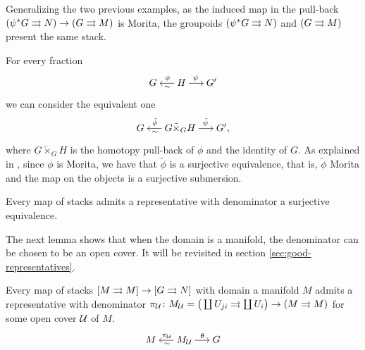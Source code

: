 \begin{example}
Generalizing the two previous examples, as the induced map in the pull-back $(\psi^*G\rightrightarrows N) \to (G\rightrightarrows M)$ is Morita, the groupoids $(\psi^*G\rightrightarrows N)$ and $(G\rightrightarrows M)$ present the same stack.
\end{example}


For every fraction
\begin{equation}
\begin{tikzcd}[sep = small]
  G & H \ar[shorten = -.15em]{l}[pos=.45, sloped, below]{\sim}[pos=.45, sloped, above]{\phi} \ar[shorten = -.15em]{r}[pos=.45]{\psi} & G'
\end{tikzcd}
\end{equation}
we can consider the equivalent one
\begin{equation}
\begin{tikzcd}[sep = small]
 G & G\tilde\times_G H \ar[shorten = -.15em]{l}[pos=.45, sloped, below]{\sim}[pos=.45, sloped, above]{\tilde\phi} \ar[shorten = -.15em]{r}[pos=.45]{\tilde\psi} & G' ,
\end{tikzcd}
\end{equation}
where $G\tilde\times_G H$ is the homotopy pull-back of $\phi$ and the identity of $G$.
As explained in \cite[Prop.\ 4.4.4]{dh13}, since $\phi$ is Morita, we have that $\tilde\phi$ is a surjective equivalence, that is, $\tilde\phi$ Morita and the map on the objects is a surjective submersion.

\begin{lemma}
Every map of stacks admits a representative with denominator a surjective equivalence.
\end{lemma}

The next lemma shows that when the domain is a manifold, the denominator can be chosen to be an open cover.
It will be revisited in section \ref{sec:good-representatives}.

\begin{lemma}\label{representative}
Every map of stacks $[M\rightrightarrows M]\to [G\rightrightarrows N]$ with domain a manifold $M$ admits a representative with denominator \( \pi_\mathcal U\colon M_\mathcal U = \big( \coprod U_{ji}\rightrightarrows \coprod U_i \big) \to (M\rightrightarrows M) \) for some open cover $\mathcal U$ of $M$.
\begin{equation}
\begin{tikzcd}[sep = small]
  M & M_\U \ar[shorten = -.15em]{l}[pos=.45, sloped, below]{\sim}[pos=.45, sloped, above]{\pi_\U} \ar[shorten = -.15em]{r}{\theta} & G
\end{tikzcd}
\end{equation}
\end{lemma}

